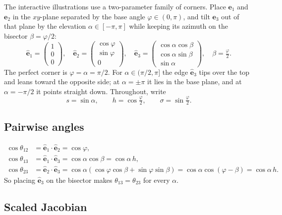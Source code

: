 \documentclass[11pt]{article}
\theoremstyle{definition}
\theoremstyle{remark}
\newcommand{\vb}[1]{\bm{#1}}
\newcommand{\uv}[1]{\hat{\bm{#1}}}
\begin{document}
The interactive illustrations use a two-parameter family of corners. Place $\vb{e}_1$ and
$\vb{e}_2$ in the $xy$-plane separated by the base angle $\varphi\in(0,\pi)$, and tilt
$\vb{e}_3$ out of that plane by the elevation $\alpha\in[-\pi,\pi]$ while keeping its
azimuth on the bisector $\beta=\varphi/2$:
\begin{equation}
  \uv{e}_1=\begin{pmatrix}1\\0\\0\end{pmatrix},\quad
  \uv{e}_2=\begin{pmatrix}\cos\varphi\\\sin\varphi\\0\end{pmatrix},\quad
  \uv{e}_3=\begin{pmatrix}\cos\alpha\cos\beta\\\cos\alpha\sin\beta\\\sin\alpha\end{pmatrix},\quad
  \beta=\tfrac{\varphi}{2}.
  \label{eq:config}
\end{equation}
The perfect corner is $\varphi=\alpha=\pi/2$. For $\alpha\in(\pi/2,\pi]$ the edge $\uv{e}_3$
tips over the top and leans toward the opposite side; at $\alpha=\pm\pi$ it lies in the base
plane, and at $\alpha=-\pi/2$ it points straight down. Throughout, write
\begin{equation}
  s=\sin\alpha,\qquad h=\cos\tfrac{\varphi}{2},\qquad \sigma=\sin\tfrac{\varphi}{2}.
\end{equation}

\subsection{Pairwise angles}

\begin{align}
  \cos\theta_{12} &= \uv{e}_1\cdot\uv{e}_2=\cos\varphi, \label{eq:c12}\\
  \cos\theta_{13} &= \uv{e}_1\cdot\uv{e}_3=\cos\alpha\cos\beta=\cos\alpha\,h, \label{eq:c13}\\
  \cos\theta_{23} &= \uv{e}_2\cdot\uv{e}_3=\cos\alpha(\cos\varphi\cos\beta+\sin\varphi\sin\beta)
                    =\cos\alpha\cos(\varphi-\beta)=\cos\alpha\,h. \label{eq:c23}
\end{align}
So placing $\uv{e}_3$ on the bisector makes $\theta_{13}=\theta_{23}$ for every $\alpha$.

\subsection{Scaled Jacobian}
\end{document}
